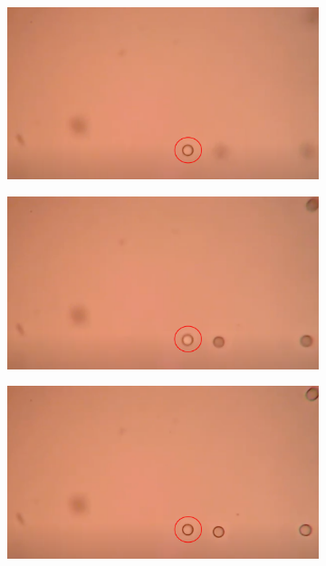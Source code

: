 \documentclass[letterpaper,12pt,oneside]{book}
\begin{document}
\begin{figure}[H]
\begin{subfigure}[b]{0.3\textwidth}
         \caption{}
         \label{fig:five over x}
     \end{subfigure}
        \hfill
        \\\noindent \centering \begin{subfigure}[b]{0.3\textwidth}
         \centering
         \includegraphics[width=\textwidth]{Results/jonas4.png}
         \caption{}
         \label{fig:five over x}
     \end{subfigure}
     \hfill
     \begin{subfigure}[b]{0.3\textwidth}
         \centering
         \includegraphics[width=\textwidth]{Results/jonas555.png}
         \caption{}
         \label{fig:five over x}
     \end{subfigure}
     \hfill
     \begin{subfigure}[b]{0.3\textwidth}
         \centering
         \includegraphics[width=\textwidth]{Results/circle66.png}

\end{subfigure}
\end{figure}
\end{document}
